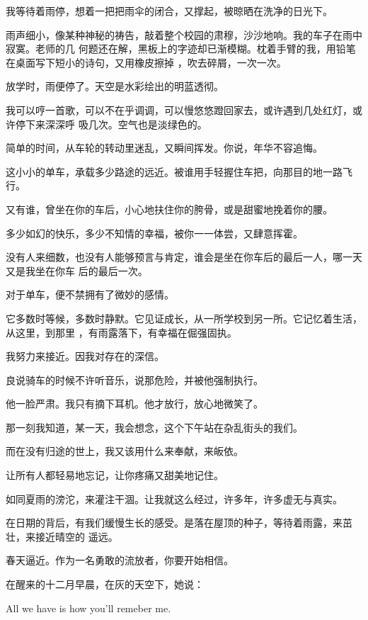 \documentclass[12pt,a4paper]{article}
\begin{document}
		我等待着雨停，想着一把把雨伞的闭合，又撑起，被晾晒在洗净的日光下。

		雨声细小，像某种神秘的祷告，敲着整个校园的肃穆，沙沙地响。我的车子在雨中寂寞。老师的几
	何题还在解，黑板上的字迹却已渐模糊。枕着手臂的我，用铅笔在桌面写下短小的诗句，又用橡皮擦掉
	，吹去碎屑，一次一次。

		放学时，雨便停了。天空是水彩绘出的明蓝透彻。

		我可以哼一首歌，可以不在乎调调，可以慢悠悠蹬回家去，或许遇到几处红灯，或许停下来深深呼
	吸几次。空气也是淡绿色的。


		简单的时间，从车轮的转动里迷乱，又瞬间挥发。你说，年华不容追悔。\par
		这小小的单车，承载多少路途的远近。被谁用手轻握住车把，向那目的地一路飞行。\par
		又有谁，曾坐在你的车后，小心地扶住你的胯骨，或是甜蜜地挽着你的腰。\par
		多少如幻的快乐，多少不知情的幸福，被你一一体尝，又肆意挥霍。

		没有人来细数，也没有人能够预言与肯定，谁会是坐在你车后的最后一人，哪一天又是我坐在你车
	后的最后一次。

		对于单车，便不禁拥有了微妙的感情。

		它多数时等候，多数时静默。它见证成长，从一所学校到另一所。它记忆着生活，从这里，到那里
	，有雨露落下，有幸福在倔强固执。

		我努力来接近。因我对存在的深信。\par
		良说骑车的时候不许听音乐，说那危险，并被他强制执行。\par
		他一脸严肃。我只有摘下耳机。他才放行，放心地微笑了。\par
		那一刻我知道，某一天，我会想念，这个下午站在杂乱街头的我们。\par
		而在没有归途的世上，我又该用什么来奉献，来皈依。\par
		让所有人都轻易地忘记，让你疼痛又甜美地记住。\par
		如同夏雨的滂沱，来灌注干涸。让我就这么经过，许多年，许多虚无与真实。

		在日期的背后，有我们缓慢生长的感受。是落在屋顶的种子，等待着雨露，来茁壮，来接近晴空的
	遥远。

		春天逼近。作为一名勇敢的流放者，你要开始相信。

	\endwriting



		在醒来的十二月早晨，在灰的天空下，她说：

		All we have is how you'll remeber me.
\end{document}
